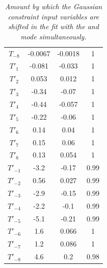 \begin{table}[!h]
\begin{center}
\begin{tabular}{c| c| c|c}
$T_{-8}$ & -0.0067 & -0.0018 & 1\\ 
$T'_1$ & -0.081 & -0.033 & 1\\ 
$T'_2$ & 0.053 & 0.012 & 1\\ 
$T'_3$ & -0.34 & -0.07 & 1\\ 
$T'_4$ & -0.44 & -0.057 & 1\\ 
$T'_5$ & -0.22 & -0.06 & 1\\ 
$T'_6$ & 0.14 & 0.04 & 1\\ 
$T'_7$ & 0.15 & 0.06 & 1\\ 
$T'_8$ & 0.13 & 0.054 & 1\\ 
$T'_{-1}$ & -3.2 & -0.17 & 0.99\\ 
$T'_{-2}$ & 0.56 & 0.027 & 0.99\\ 
$T'_{-3}$ & -2.9 & -0.15 & 0.99\\ 
$T'_{-4}$ & -2.2 & -0.1 & 0.99\\ 
$T'_{-5}$ & -5.1 & -0.21 & 0.99\\ 
$T'_{-6}$ & 1.6 & 0.066 & 1\\ 
$T'_{-7}$ & 1.2 & 0.086 & 1\\ 
$T'_{-8}$ & 4.6 & 0.2 & 0.98\\ 
\end{tabular}
\end{center}
\caption{\textit{Amount by which the Gaussian constraint input variables are shifted in the fit with the \KsPiPi and \KlPiPi mode simultaneously.}}
\end{table} 
